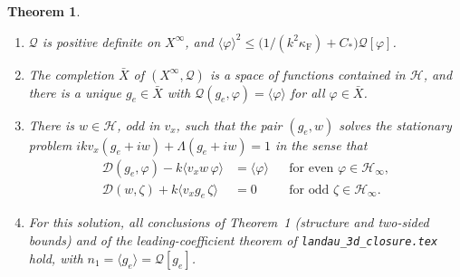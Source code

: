 \documentclass[11pt]{article}
\newcommand{\cD}{\mathcal{D}}
\newcommand{\cH}{\mathcal{H}}
\newcommand{\cQ}{\mathcal{Q}}
\newcommand{\avg}[1]{\langle #1\rangle}
\newtheorem{theorem}{Theorem}
\theoremstyle{remark}
\begin{document}
\begin{theorem}\label{thm:exist}
\begin{enumerate}
  \item[(i)] $\cQ$ is positive definite on $X^\infty$, and
    $\avg{\varphi}^2\le\bigl(1/(k^2\kappa_{\mathrm F})+C_*\bigr)\cQ[\varphi]$.
  \item[(ii)] The completion $\bar X$ of $(X^\infty,\cQ)$ is a space of
    functions contained in $\cH$, and there is a unique $g_e\in\bar X$ with
    $\cQ(g_e,\varphi)=\avg{\varphi}$ for all $\varphi\in\bar X$.
  \item[(iii)] There is $w\in\cH$, odd in $v_x$, such that the pair
    $(g_e,w)$ solves the stationary problem
    $ikv_x(g_e+iw)+\Lambda(g_e+iw)=1$ in the sense that
    \begin{align}
      \cD(g_e,\varphi)-k\avg{v_xw\,\varphi}&=\avg{\varphi}
        &&\text{for even }\varphi\in\cH_\infty, \label{eq:E1}\\
      \cD(w,\zeta)+k\avg{v_xg_e\,\zeta}&=0
        &&\text{for odd }\zeta\in\cH_\infty. \label{eq:E2}
    \end{align}
  \item[(iv)] For this solution, all conclusions of Theorem~1 (structure and
    two-sided bounds) and of the leading-coefficient theorem of
    \texttt{landau\_3d\_closure.tex} hold, with
    $n_1=\avg{g_e}=\cQ[g_e]$.
\end{enumerate}
\end{theorem}
\end{document}
